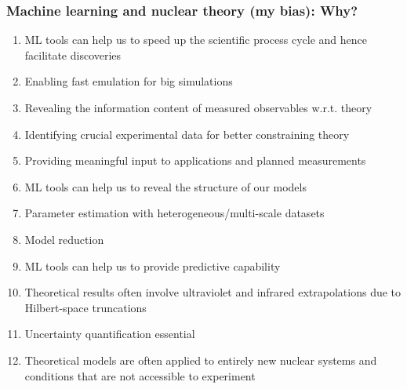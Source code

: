 \documentclass{beamer}
\begin{document}
\begin{frame}
\frametitle{Machine learning and nuclear theory (my bias): Why?}

\begin{enumerate}
\item ML tools can help us to speed up the scientific process cycle and hence facilitate discoveries

\item Enabling fast emulation for big simulations

\item Revealing the information content of measured observables w.r.t. theory

\item Identifying crucial experimental data for better constraining theory

\item Providing meaningful input to applications and planned measurements

\item ML tools can help us to reveal the structure of our models

\item Parameter estimation with heterogeneous/multi-scale datasets

\item Model reduction

\item ML tools can help us to provide predictive capability

\item Theoretical results often involve ultraviolet  and infrared extrapolations due to Hilbert-space truncations 

\item Uncertainty quantification essential

\item Theoretical models are often applied to entirely new nuclear systems and conditions that are not accessible to experiment
\end{enumerate}

\noindent
\end{frame}
\end{document}
